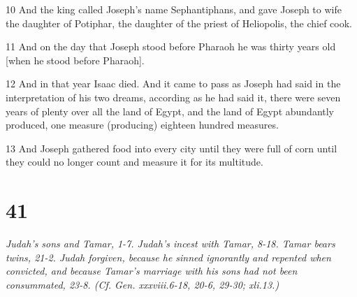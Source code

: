 \par 10 And the king called Joseph's name Sephantiphans, and gave Joseph to wife the daughter of Potiphar, the daughter of the priest of Heliopolis, the chief cook.
\par 11 And on the day that Joseph stood before Pharaoh he was thirty years old [when he stood before Pharaoh].
\par 12 And in that year Isaac died. And it came to pass as Joseph had said in the interpretation of his two dreams, according as he had said it, there were seven years of plenty over all the land of Egypt, and the land of Egypt abundantly produced, one measure (producing) eighteen hundred measures.
\par 13 And Joseph gathered food into every city until they were full of corn until they could no longer count and measure it for its multitude.

\chapter{41}

\par \textit{Judah's sons and Tamar, 1-7. Judah's incest with Tamar, 8-18. Tamar bears twins, 21-2. Judah forgiven, because he sinned ignorantly and repented when convicted, and because Tamar's marriage with his sons had not been consummated, 23-8. (Cf. Gen. xxxviii.6-18, 20-6, 29-30; xli.13.)}

